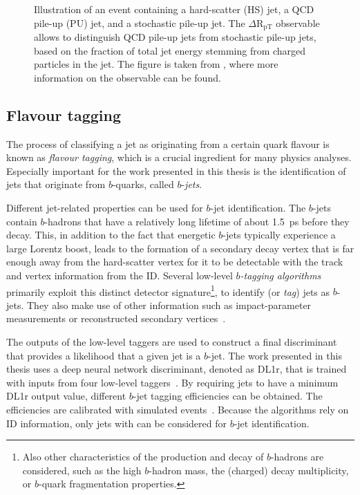 \FloatBarrier
\begin{figure}[t]
    \caption{Illustration of an event containing a hard-scatter (HS) jet, a QCD pile-up (PU) jet, and a stochastic pile-up jet. The $\Delta \text{R}_{\text{pT}}$ observable allows to distinguish QCD pile-up jets from stochastic pile-up jets, based on the fraction of total jet energy stemming from charged particles in the jet. The figure is taken from , where more information on the observable can be found.}
    \label{fig:pile-up-jets-illustration}
\end{figure}


\subsection{Flavour tagging}
The process of classifying a jet as originating from a certain quark flavour is known as \emph{flavour tagging}, which is a crucial ingredient for many physics analyses. Especially important for the work presented in this thesis is the identification of jets that originate from $b$-quarks, called $b$-\emph{jets}.

Different jet-related properties can be used for $b$-jet identification.
The $b$-jets contain $b$-hadrons that have a relatively long lifetime of about \SI{1.5}{\pico\second} before they decay. This, in addition to the fact that energetic $b$-jets typically experience a large Lorentz boost, leads to the formation of a secondary decay vertex that is far enough away from the hard-scatter vertex for it to be detectable with the track and vertex information from the ID.
Several low-level \emph{$b$-tagging algorithms} primarily exploit this distinct detector signature\footnote{Also other characteristics of the production and decay of $b$-hadrons are considered, such as the high $b$-hadron mass, the (charged) decay multiplicity, or $b$-quark fragmentation properties.}, to identify (or \emph{tag}) jets as $b$-jets. They also make use of other information such as impact-parameter measurements or reconstructed secondary vertices~\cite{ATL-PHYS-PUB-2017-013}.

The outputs of the low-level taggers are used to construct a final discriminant that provides a likelihood that a given jet is a $b$-jet. The work presented in this thesis uses a deep neural network discriminant, denoted as DL1r, that is trained with inputs from four low-level taggers~\cite{ATL-PHYS-PUB-2017-013}.
By requiring jets to have a minimum DL1r output value, different $b$-jet tagging efficiencies can be obtained. The efficiencies are calibrated with simulated \ttbar events~\cite{FTAG-2018-01}.
Because the algorithms rely on ID information, only jets with  can be considered for $b$-jet identification.



